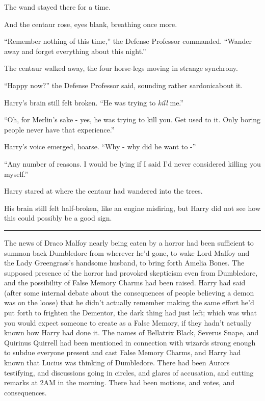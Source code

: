 The wand stayed there for a time.

And the centaur rose, eyes blank, breathing once more.

``Remember nothing of this time,'' the Defense Professor commanded. ``Wander away and forget everything about this night.''

The centaur walked away, the four horse-legs moving in strange synchrony.

``Happy now?'' the Defense Professor said, sounding rather sardonicabout it.

Harry's brain still felt broken. ``He was trying to \emph{kill} me.''

``Oh, for Merlin's sake - yes, he was trying to kill you. Get used to it. Only boring people never have that experience.''

Harry's voice emerged, hoarse. ``Why - why did he want to -''

``Any number of reasons. I would be lying if I said I'd never considered killing you myself.''

Harry stared at where the centaur had wandered into the trees.

His brain still felt half-broken, like an engine misfiring, but Harry did not see how this could possibly be a good sign.

\begin{center}\rule{3in}{0.4pt}\end{center}

The news of Draco Malfoy nearly being eaten by a horror had been sufficient to summon back Dumbledore from wherever he'd gone, to wake Lord Malfoy and the Lady Greengrass's handsome husband, to bring forth Amelia Bones. The supposed presence of the horror had provoked skepticism even from Dumbledore, and the possibility of False Memory Charms had been raised. Harry had said (after some internal debate about the consequences of people believing a demon was on the loose) that he didn't actually remember making the same effort he'd put forth to frighten the Dementor, the dark thing had just left; which was what you would expect someone to create as a False Memory, if they hadn't actually known how Harry had done it. The names of Bellatrix Black, Severus Snape, and Quirinus Quirrell had been mentioned in connection with wizards strong enough to subdue everyone present and cast False Memory Charms, and Harry had known that Lucius was thinking of Dumbledore. There had been Aurors testifying, and discussions going in circles, and glares of accusation, and cutting remarks at 2AM in the morning. There had been motions, and votes, and consequences.

